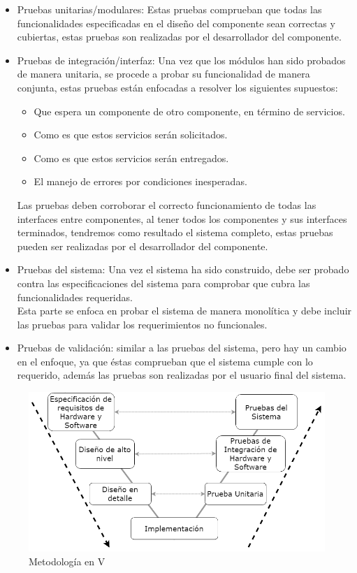 \begin{itemize}

    \item Pruebas unitarias/modulares: Estas pruebas comprueban que todas las funcionalidades especificadas en el diseño del componente sean correctas y cubiertas, estas pruebas son realizadas por el desarrollador del componente.
    
    \item Pruebas de integración/interfaz: Una vez que los módulos han sido probados de manera unitaria, se procede a probar su funcionalidad de manera conjunta, estas pruebas están enfocadas a resolver los siguientes supuestos:
    
    \begin{itemize}
        \item Que espera un componente de otro componente, en término de servicios.
        \item Como es que estos servicios serán solicitados.
        \item Como es que estos servicios serán entregados.
        \item El manejo de errores por condiciones inesperadas.
    \end{itemize}
    
    Las pruebas deben corroborar el correcto funcionamiento de todas las interfaces entre componentes, al tener todos los componentes y sus interfaces terminados, tendremos como resultado el sistema completo, estas pruebas pueden ser realizadas por el desarrollador del componente.
    
    \item Pruebas del sistema: Una vez el sistema ha sido construido, debe ser probado contra las especificaciones del sistema para comprobar que cubra las funcionalidades requeridas.\\
    Esta parte se enfoca en probar el sistema de manera monolítica y debe incluir las pruebas para validar los requerimientos no funcionales.

    \item Pruebas de validación: similar a las pruebas del sistema, pero hay un cambio en el enfoque, ya que éstas comprueban que el sistema cumple con lo requerido, además las pruebas son realizadas por el usuario final del sistema.

\end{itemize}

\begin{figure}[H]
	\centering
	\includegraphics[scale=.5]{Capitulo3/img/vmodel.png}
	\caption{Metodología en V}
	\label{fig:ModeloIncremental}
\end{figure}


